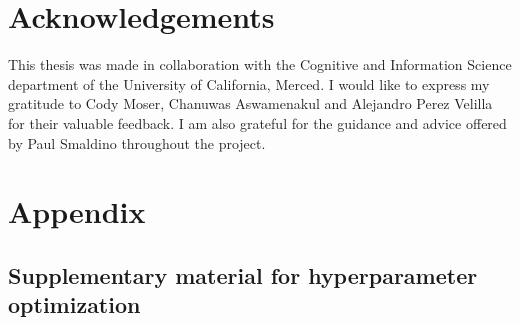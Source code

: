 \documentclass[11pt]{article}
\begin{document}
\section{Acknowledgements}
This thesis was made in collaboration with the Cognitive and Information Science department of the University of California, Merced. I would like to express my gratitude to Cody Moser, Chanuwas Aswamenakul and Alejandro Perez Velilla for their valuable feedback. I am also grateful for the guidance and advice offered by Paul Smaldino throughout the project.





\appendix
\section{Appendix}
\label{appendix}
\renewcommand\thefigure{\thesection.\arabic{figure}}    
\setcounter{figure}{0}  

\subsection{Supplementary material for hyperparameter optimization}
\end{document}
